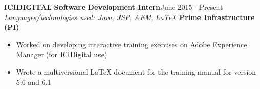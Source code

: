 \documentclass[11pt]{article}
\begin{document}
\begin{multicols}{2}
			{\bfseries ICIDIGITAL}\newline
			{\bfseries \small Software Development Intern}\hfill{June 2015 - Present}\newline			
				\textit{Languages/technologies used: Java, JSP, AEM, LaTeX}\newline
				{\bfseries Prime Infrastructure (PI)}
				\begin{itemize}[nolistsep,leftmargin=*]
					\item Worked on developing interactive training exercises on Adobe Experience Manager (for ICIDigital use)
					\item Wrote a multiversional LaTeX document for the training manual for version 5.6 and 6.1
				\end{itemize}





\end{multicols}
\end{document}
